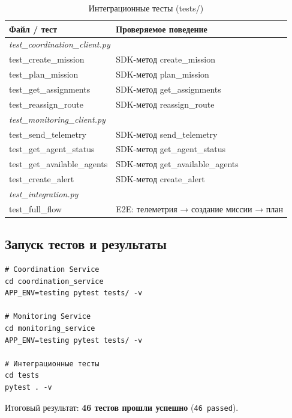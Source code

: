 \documentclass[12pt,a4paper]{article}
\begin{document}
\begin{table}[H]
\centering
\caption{Интеграционные тесты (tests/)}
\begin{tabularx}{\textwidth}{|l|X|}
\hline
\textbf{Файл / тест} & \textbf{Проверяемое поведение} \\
\hline
\multicolumn{2}{|l|}{\textit{test\_coordination\_client.py}} \\
\hline
test\_create\_mission       & SDK-метод create\_mission \\
test\_plan\_mission         & SDK-метод plan\_mission \\
test\_get\_assignments      & SDK-метод get\_assignments \\
test\_reassign\_route       & SDK-метод reassign\_route \\
\hline
\multicolumn{2}{|l|}{\textit{test\_monitoring\_client.py}} \\
\hline
test\_send\_telemetry       & SDK-метод send\_telemetry \\
test\_get\_agent\_status    & SDK-метод get\_agent\_status \\
test\_get\_available\_agents & SDK-метод get\_available\_agents \\
test\_create\_alert         & SDK-метод create\_alert \\
\hline
\multicolumn{2}{|l|}{\textit{test\_integration.py}} \\
\hline
test\_full\_flow            & E2E: телеметрия → создание миссии → план \\
\hline
\end{tabularx}
\end{table}

\subsection{Запуск тестов и результаты}

\begin{lstlisting}[style=bash, caption={Запуск тестов}]
# Coordination Service
cd coordination_service
APP_ENV=testing pytest tests/ -v

# Monitoring Service
cd monitoring_service
APP_ENV=testing pytest tests/ -v

# Интеграционные тесты
cd tests
pytest . -v
\end{lstlisting}

Итоговый результат: \textbf{46 тестов прошли успешно} (\texttt{46 passed}).

\end{document}
